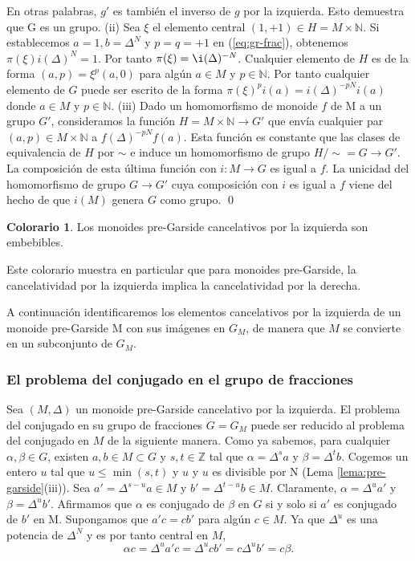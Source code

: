 \documentclass[12pt]{article}
\theoremstyle{definition}
\newtheorem{colo}{Colorario}[section]
\begin{document}
En otras palabras, $g'$ es también el inverso de $g$ por la izquierda. Esto demuestra que G es un grupo.
(ii) Sea $\xi$ el elemento central $(1,+1)\in H=M\times\mathbb{N}$. Si establecemos $a=1,b=\Delta^N$ y $p=q=+1$ en (\ref{eq:gr-frac}), obtenemos $\pi(\xi)i(\Delta)^N=1$. Por tanto $\pi(\xi)=\i(\Delta)^{-N}$. Cualquier elemento de $H$ es de la forma $(a,p)=\xi^p(a,0)$ para algún $a\in M$ y $p\in\mathbb{N}$. Por tanto cualquier elemento de $G$ puede ser escrito de la forma $\pi(\xi)^pi(a)=i(\Delta)^{-pN}i(a)$ donde $a\in M$ y $p\in\mathbb{N}$.
\newline
\newline
(iii) Dado un homomorfismo de monoide $f$ de M a un grupo $G'$, consideramos la función $H=M\times \mathbb{N}\rightarrow G'$ que envía cualquier par $(a,p)\in M\times \mathbb{N}$ a $f(\Delta)^{-pN}f(a)$. Esta función es constante que las clases de equivalencia de $H$ por $\sim$ e induce un homomorfismo de grupo $H/\sim=G\rightarrow G'$. La composición de esta última función con $i:M\rightarrow G$ es igual a $f$. La unicidad del homomorfismo de grupo $G\rightarrow G'$ cuya composición con $i$ es igual a $f$ viene del hecho de que $i(M)$ genera $G$ como grupo. \qed

\begin{colo}
Los monoides pre-Garside cancelativos por la izquierda son embebibles.
\label{colo:pre-garside-embe}
\end{colo}
Este colorario muestra en particular que para monoides pre-Garside, la cancelatividad por la izquierda implica la cancelatividad por la derecha.

A continuación identificaremos los elementos cancelativos por la izquierda de un monoide pre-Garside M con sus imágenes en $G_M$, de manera que $M$ se convierte en un subconjunto de $G_M$.

\subsubsection{El problema del conjugado en el grupo de fracciones}

Sea $(M,\Delta)$ un monoide pre-Garside cancelativo por la izquierda. El problema del conjugado en su grupo de fracciones $G=G_M$ puede ser reducido al problema del conjugado en $M$ de la siguiente manera. Como ya sabemos, para cualquier $\alpha,\beta\in G$, existen $a,b\in M\subset G$ y $s,t\in\mathbb{Z}$ tal que $\alpha=\Delta^sa$ y $\beta=\Delta^t b$. Cogemos un entero $u$ tal que $u\leq \min(s,t)$ y $u$ y $u$ es divisible por N (Lema \ref{lema:pre-garside}(iii)). Sea $a'=\Delta^{s-u}a\in M$ y $b'=\Delta^{t-u}b\in M$. Claramente, $\alpha=\Delta^ua'$ y $\beta=\Delta^ub'$. Afirmamos que $\alpha$ es conjugado de $\beta$ en $G$ si y solo si $a'$ es conjugado de $b'$ en M. Supongamos que $a'c=cb'$ para algún $c\in M$. Ya que $\Delta^u$ es una potencia de $\Delta^N$ y es por tanto central en $M$,
$$\alpha c=\Delta^u a'c=\Delta^u c b' = c\Delta^u b'=c\beta.$$
\end{document}
